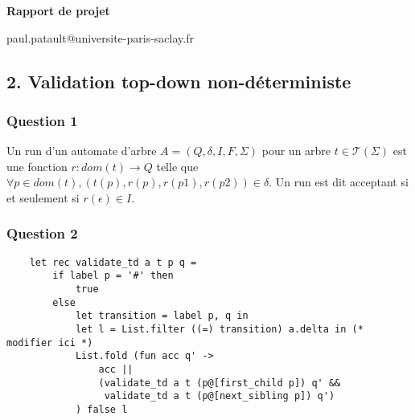 \documentclass[a4paper,12pt]{article}
\begin{document}

\setlength{\headheight}{13.59999pt}
\addtolength{\topmargin}{-1.59999pt}


\begin{center}

  \textbf{\Large Rapport de projet}


  {\ttfamily paul.patault@universite-paris-saclay.fr} \\


\end{center}


\subsection*{2. Validation top-down non-déterministe}
\subsubsection*{Question 1}

Un run d'un automate d'arbre $A = (Q, \delta, I, F, \Sigma)$
pour un arbre $t \in {\mathcal{T}}(\Sigma)$
est une fonction $r : dom(t) \to Q$
telle que $\forall p \in dom(t), (t(p), r(p), r(p1),r(p2)) \in \delta$.
Un run est dit acceptant si et seulement si $r (\epsilon) \in I$.

\subsubsection*{Question 2}

  \begin{verbatim}
    let rec validate_td a t p q =
        if label p = '#' then
            true
        else
            let transition = label p, q in
            let l = List.filter ((=) transition) a.delta in (* modifier ici *)
            List.fold (fun acc q' ->
                acc ||
                (validate_td a t (p@[first_child p]) q' &&
                 validate_td a t (p@[next_sibling p]) q')
            ) false l
   \end{verbatim}
\end{document}
